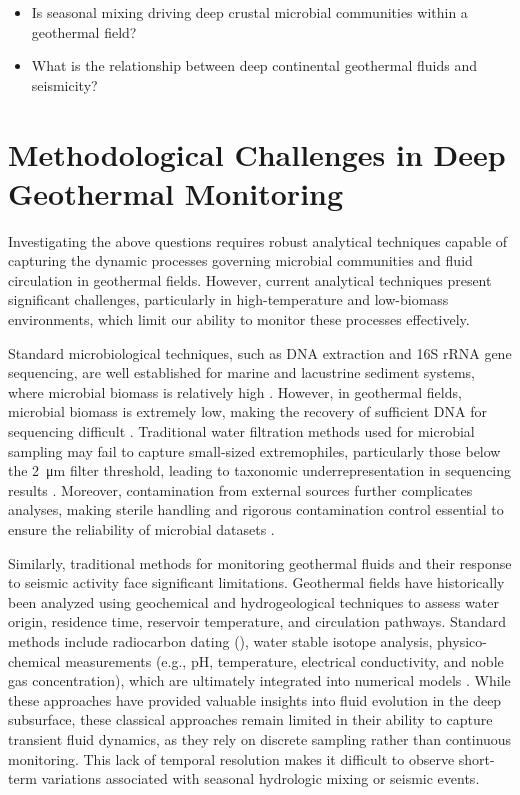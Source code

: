 \begin{itemize}
    \item Is seasonal mixing driving deep crustal microbial communities within a geothermal field?
    \item What is the relationship between deep continental geothermal fluids and seismicity?
\end{itemize}

\section{Methodological Challenges in Deep Geothermal Monitoring}
Investigating the above questions requires robust analytical techniques capable of capturing the dynamic processes governing microbial communities and fluid circulation in geothermal fields.
However, current analytical techniques present significant challenges, particularly in high-temperature and low-biomass environments, which limit our ability to monitor these processes effectively.

Standard microbiological techniques, such as DNA extraction and 16S rRNA gene sequencing, are well established for marine and lacustrine sediment systems, where microbial biomass is relatively high \citep{lever2015modular}.
However, in geothermal fields, microbial biomass is extremely low, making the recovery of sufficient DNA for sequencing difficult \citep{rzonca2003micro}.
Traditional water filtration methods used for microbial sampling may fail to capture small-sized extremophiles, particularly those below the \SI{2}{\micro\metre} filter threshold, leading to taxonomic underrepresentation in sequencing results \citep{rzonca2003micro,tian2020patesci}.
Moreover, contamination from external sources further complicates analyses, making sterile handling and rigorous contamination control essential to ensure the reliability of microbial datasets \citep{eisenhofer2019contamination}.

Similarly, traditional methods for monitoring geothermal fluids and their response to seismic activity face significant limitations.
Geothermal fields have historically been analyzed using geochemical and hydrogeological techniques to assess water origin, residence time, reservoir temperature, and circulation pathways.
Standard methods include radiocarbon dating (), water stable isotope analysis, physico-chemical measurements (e.g., pH, temperature, electrical conductivity, and noble gas concentration), which are ultimately integrated into numerical models \citep{vuataz1983hydrology, sonney2009numerical, wanner2019quantification, kipfer2002noble}.
While these approaches have provided valuable insights into fluid evolution in the deep subsurface, these classical approaches remain limited in their ability to capture transient fluid dynamics, as they rely on discrete sampling rather than continuous monitoring.
This lack of temporal resolution makes it difficult to observe short-term variations associated with seasonal hydrologic mixing or seismic events.

